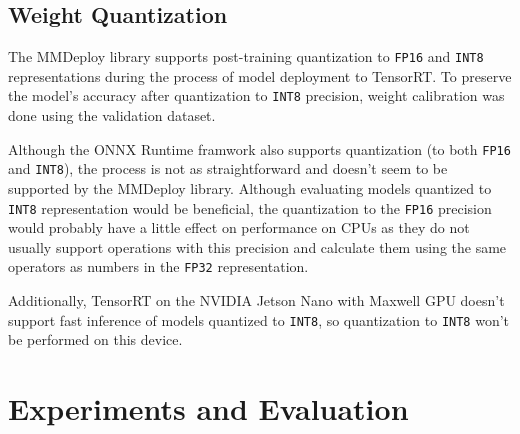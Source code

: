 







\subsection*{Weight Quantization}

The MMDeploy library supports post-training quantization to \texttt{FP16} and
\texttt{INT8} representations during the process of model deployment to TensorRT.
To preserve the model's accuracy after quantization to \texttt{INT8} precision, weight calibration
was done using the validation dataset.


Although the ONNX Runtime framwork also supports quantization (to both
\texttt{FP16} and \texttt{INT8}), the process is not as straightforward and
doesn't seem to be supported by the MMDeploy library. Although evaluating models
quantized to \texttt{INT8} representation would be beneficial, the quantization
to the \texttt{FP16} precision would probably have a little effect on performance on CPUs as
they do not usually support operations with this precision and calculate them using the same
operators as numbers in the \texttt{FP32} representation.

Additionally, TensorRT on the NVIDIA Jetson Nano with Maxwell GPU doesn't
support fast inference of models quantized to \texttt{INT8}, so quantization to
\texttt{INT8} won't be performed on this device.



\section{Experiments and Evaluation}

